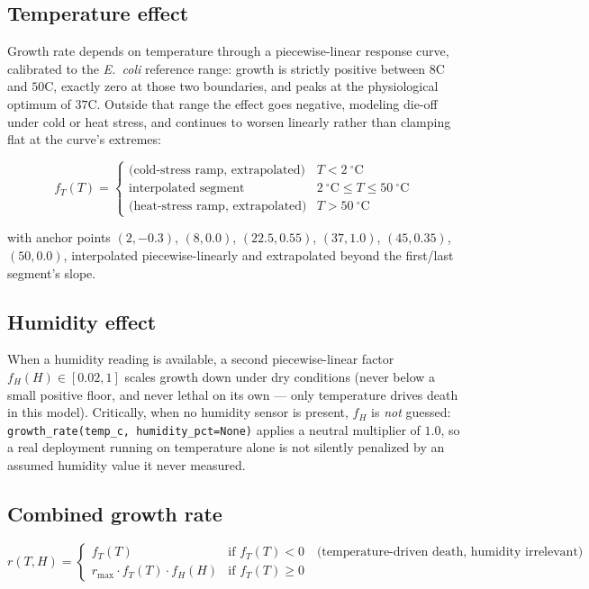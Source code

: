 \documentclass[11pt]{article}
\begin{document}
\subsection{Temperature effect}

Growth rate depends on temperature through a piecewise-linear response curve, calibrated to the \emph{E.~coli} reference range: growth is strictly positive between \(8\)\textdegree{}C and \(50\)\textdegree{}C, exactly zero at those two boundaries, and peaks at the physiological optimum of \(37\)\textdegree{}C. Outside that range the effect goes negative, modeling die-off under cold or heat stress, and continues to worsen linearly rather than clamping flat at the curve's extremes:

\[
f_T(T) = \begin{cases}
\text{(cold-stress ramp, extrapolated)} & T < 2\ ^\circ\text{C} \\
\text{interpolated segment} & 2\ ^\circ\text{C} \le T \le 50\ ^\circ\text{C} \\
\text{(heat-stress ramp, extrapolated)} & T > 50\ ^\circ\text{C}
\end{cases}
\]

with anchor points \((2, -0.3)\), \((8, 0.0)\), \((22.5, 0.55)\), \((37, 1.0)\), \((45, 0.35)\), \((50, 0.0)\), interpolated piecewise-linearly and extrapolated beyond the first/last segment's slope.

\subsection{Humidity effect}

When a humidity reading is available, a second piecewise-linear factor \(f_H(H) \in [0.02, 1]\) scales growth down under dry conditions (never below a small positive floor, and never lethal on its own --- only temperature drives death in this model). Critically, when no humidity sensor is present, \(f_H\) is \emph{not} guessed: \texttt{growth\_rate(temp\_c, humidity\_pct=None)} applies a neutral multiplier of \(1.0\), so a real deployment running on temperature alone is not silently penalized by an assumed humidity value it never measured.

\subsection{Combined growth rate}

\[
r(T, H) = \begin{cases}
f_T(T) & \text{if } f_T(T) < 0 \quad \text{(temperature-driven death, humidity irrelevant)} \\
r_{\max} \cdot f_T(T) \cdot f_H(H) & \text{if } f_T(T) \ge 0
\end{cases}
\]
\end{document}
